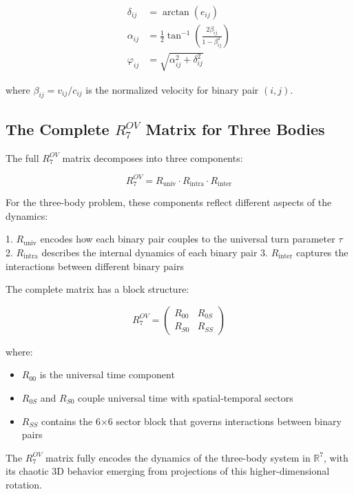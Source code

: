 \documentclass{article}
\begin{document}
\begin{align}
\delta_{ij} &= \arctan(e_{ij}) \\
\alpha_{ij} &= \frac{1}{2}\tan^{-1}\left(\frac{2\beta_{ij}}{1-\beta_{ij}^2}\right) \\
\varphi_{ij} &= \sqrt{\alpha_{ij}^2 + \delta_{ij}^2}
\end{align}

where $\beta_{ij} = v_{ij}/c_{ij}$ is the normalized velocity for binary pair $(i,j)$.

\subsection{The Complete $R^{OV}_7$ Matrix for Three Bodies}

The full $R^{OV}_7$ matrix decomposes into three components:

\begin{equation}
R^{OV}_7 = R_{\text{univ}} \cdot R_{\text{intra}} \cdot R_{\text{inter}}
\end{equation}

For the three-body problem, these components reflect different aspects of the dynamics:

1. $R_{\text{univ}}$ encodes how each binary pair couples to the universal turn parameter $\tau$
2. $R_{\text{intra}}$ describes the internal dynamics of each binary pair
3. $R_{\text{inter}}$ captures the interactions between different binary pairs

The complete matrix has a block structure:

\begin{equation}
R^{OV}_7 = 
\begin{pmatrix}
R_{00} & R_{0S} \\
R_{S0} & R_{SS}
\end{pmatrix}
\end{equation}

where:
\begin{itemize}
\item $R_{00}$ is the universal time component
\item $R_{0S}$ and $R_{S0}$ couple universal time with spatial-temporal sectors
\item $R_{SS}$ contains the 6×6 sector block that governs interactions between binary pairs
\end{itemize}

The $R^{OV}_7$ matrix fully encodes the dynamics of the three-body system in $\mathbb{R}^7$, with its chaotic 3D behavior emerging from projections of this higher-dimensional rotation.
\end{document}
